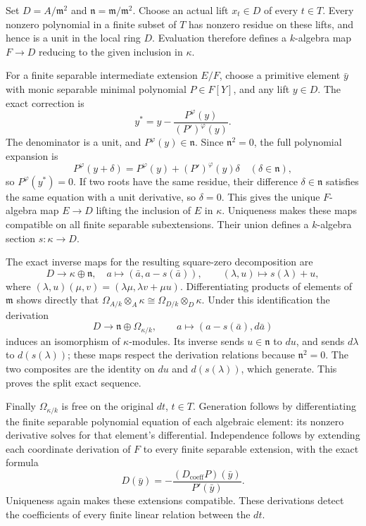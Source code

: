 Set \(D=A/\mathfrak m^2\) and \(\mathfrak n=\mathfrak m/\mathfrak m^2\). Choose an actual lift \(x_t\in D\) of every \(t\in T\). Every nonzero polynomial in a finite subset of \(T\) has nonzero residue on these lifts, and hence is a unit in the local ring \(D\). Evaluation therefore defines a \(k\)-algebra map \(F\to D\) reducing to the given inclusion in \(\kappa\).

For a finite separable intermediate extension \(E/F\), choose a primitive element \(\bar y\) with monic separable minimal polynomial \(P\in F[Y]\), and any lift \(y\in D\). The exact correction is \[
y^*=y-\frac{P^\varphi(y)}{(P')^\varphi(y)}.
\] The denominator is a unit, and \(P^\varphi(y)\in\mathfrak n\). Since \(\mathfrak n^2=0\), the full polynomial expansion is \[
P^\varphi(y+\delta)=P^\varphi(y)+(P')^\varphi(y)\delta
\quad(\delta\in\mathfrak n),
\] so \(P^\varphi(y^*)=0\). If two roots have the same residue, their difference \(\delta\in\mathfrak n\) satisfies the same equation with a unit derivative, so \(\delta=0\). This gives the unique \(F\)-algebra map \(E\to D\) lifting the inclusion of \(E\) in \(\kappa\). Uniqueness makes these maps compatible on all finite separable subextensions. Their union defines a \(k\)-algebra section \(s:\kappa\to D\).

The exact inverse maps for the resulting square-zero decomposition are \[
D\longrightarrow\kappa\oplus\mathfrak n,\quad
a\longmapsto(\bar a,a-s(\bar a)),\qquad
(\lambda,u)\longmapsto s(\lambda)+u,
\] where \((\lambda,u)(\mu,v)=(\lambda\mu,\lambda v+\mu u)\). Differentiating products of elements of \(\mathfrak m\) shows directly that \(\Omega_{A/k}\otimes_A\kappa\cong\Omega_{D/k}\otimes_D\kappa\). Under this identification the derivation \[
D\longrightarrow\mathfrak n\oplus\Omega_{\kappa/k},\qquad
a\longmapsto(a-s(\bar a),d\bar a)
\] induces an isomorphism of \(\kappa\)-modules. Its inverse sends \(u\in\mathfrak n\) to \(du\), and sends \(d\lambda\) to \(d(s(\lambda))\); these maps respect the derivation relations because \(\mathfrak n^2=0\). The two composites are the identity on \(du\) and \(d(s(\lambda))\), which generate. This proves the split exact sequence.

Finally \(\Omega_{\kappa/k}\) is free on the original \(dt\), \(t\in T\). Generation follows by differentiating the finite separable polynomial equation of each algebraic element: its nonzero derivative solves for that element's differential. Independence follows by extending each coordinate derivation of \(F\) to every finite separable extension, with the exact formula \[
D(\bar y)=-\frac{(D_{\mathrm{coeff}}P)(\bar y)}{P'(\bar y)}.
\] Uniqueness again makes these extensions compatible. These derivations detect the coefficients of every finite linear relation between the \(dt\).

